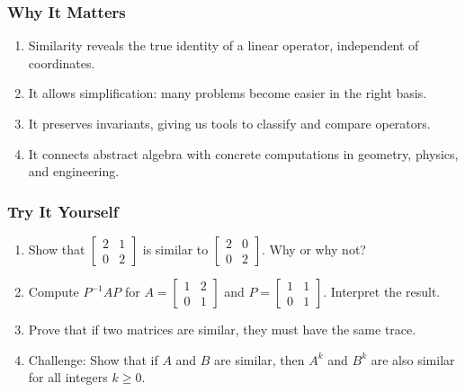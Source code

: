 \documentclass[
  letterpaper,
  DIV=11,
  numbers=noendperiod]{scrreprt}
\providecommand{\tightlist}{%
  \setlength{\itemsep}{0pt}\setlength{\parskip}{0pt}}
\begin{document}
\subsubsection{Why It Matters}\label{why-it-matters-42}

\begin{enumerate}
\def\labelenumi{\arabic{enumi}.}
\tightlist
\item
  Similarity reveals the true identity of a linear operator, independent
  of coordinates.
\item
  It allows simplification: many problems become easier in the right
  basis.
\item
  It preserves invariants, giving us tools to classify and compare
  operators.
\item
  It connects abstract algebra with concrete computations in geometry,
  physics, and engineering.
\end{enumerate}

\subsubsection{Try It Yourself}\label{try-it-yourself-45}

\begin{enumerate}
\def\labelenumi{\arabic{enumi}.}
\tightlist
\item
  Show that \(\begin{bmatrix} 2 & 1 \\ 0 & 2 \end{bmatrix}\) is similar
  to \(\begin{bmatrix} 2 & 0 \\ 0 & 2 \end{bmatrix}\). Why or why not?
\item
  Compute \(P^{-1}AP\) for
  \(A = \begin{bmatrix} 1 & 2 \\ 0 & 1 \end{bmatrix}\) and
  \(P = \begin{bmatrix} 1 & 1 \\ 0 & 1 \end{bmatrix}\). Interpret the
  result.
\item
  Prove that if two matrices are similar, they must have the same trace.
\item
  Challenge: Show that if \(A\) and \(B\) are similar, then \(A^k\) and
  \(B^k\) are also similar for all integers \(k \geq 0\).
\end{enumerate}
\end{document}
